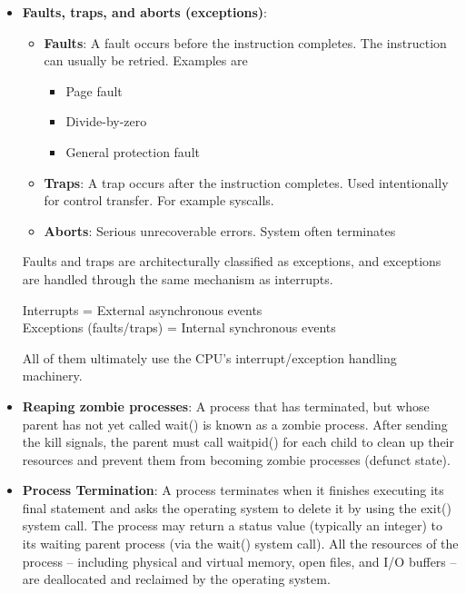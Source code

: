 \documentclass{report}
\begin{document}
\begin{itemize}
\begin{enumerate}
            \end{enumerate}
        \item \textbf{Faults, traps, and aborts (exceptions)}: 
            \begin{itemize}
                \item \textbf{Faults}: A fault occurs before the instruction completes. The instruction can usually be retried. Examples are
                    \begin{itemize}
                        \item Page fault
                        \item Divide-by-zero
                        \item General protection fault
                    \end{itemize}
                \item \textbf{Traps}: A trap occurs after the instruction completes. Used intentionally for control transfer. For example syscalls.
                \item \textbf{Aborts}: Serious unrecoverable errors. System often terminates
            \end{itemize}
            Faults and traps are architecturally classified as exceptions, and exceptions are handled through the same mechanism as interrupts.
            \begin{center}
                Interrupts = External asynchronous events \\
                Exceptions (faults/traps) = Internal synchronous events
            \end{center}
            All of them ultimately use the CPU’s interrupt/exception handling machinery.
        \item \textbf{Reaping zombie processes}: A process that has terminated, but whose parent has not yet called wait() is known as a zombie process.
            \bigbreak \noindent 
            After sending the kill signals, the parent must call waitpid() for each child to clean up their resources and prevent them from becoming zombie processes (defunct state).
        \item \textbf{Process Termination}: A process terminates when it finishes executing its final statement and asks the operating system to delete it by using the exit() system call. The process may return a status value (typically an integer) to its waiting parent process (via the wait() system call). All the resources of the process – including physical and virtual memory, open files, and I/O buffers – are deallocated and reclaimed by the operating system.

\end{itemize}
\end{document}
